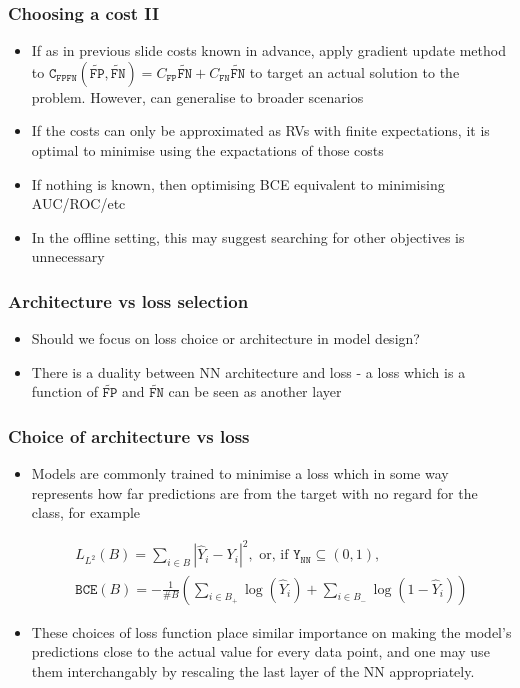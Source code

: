 \documentclass{beamer}
\newcommand{\OUT}{{\texttt{Y}}}
\newcommand{\UC}{{\texttt{C}_{\texttt{FPFN}}}}
\newcommand{\YP}{{\hat Y}}
\newcommand{\FP}{{\texttt{FP}}}
\newcommand{\FN}{{\texttt{FN}}}
\newcommand{\Fp}{\widetilde{\texttt{FP}}}
\newcommand{\Fn}{\widetilde{\texttt{FN}}}
\begin{document}
\begin{frame}
\frametitle{Choosing a cost II}
\begin{itemize}
  \item
    If as in previous slide costs known in advance, apply gradient update method to $\UC(\Fp,\Fn)=C_\FP\Fn+C_\FN\Fn$ to target an actual solution to the problem.  However, can generalise to broader scenarios
  \item
    If the costs can only be approximated as RVs with finite expectations, it is optimal to minimise using the expactations of those costs
  \item
    If nothing is known, then optimising BCE equivalent to minimising AUC/ROC/etc
  \item
    In the offline setting, this may suggest searching for other objectives is unnecessary
\end{itemize}
\end{frame}
\begin{frame}
\frametitle{Architecture vs loss selection}
\begin{itemize}
  \item
    Should we focus on loss choice or architecture in model design?
  \item
    There is a duality between NN architecture and loss - a loss which is a function of $\Fp$ and $\Fn$ can be seen as another layer
\end{itemize}
\end{frame}
\begin{frame}
\frametitle{Choice of architecture vs loss}
\begin{itemize}
\item
Models are commonly trained to minimise a loss which in some way represents how far predictions are from the target with no regard for the class, for example

\begin{gather*}
  L_{L^2}(B)=\sum_{i\in B} |\YP_i-Y_i|^2,\text{ or, if }\OUT_{\texttt{NN}}\subseteq(0,1),\\
  \texttt{BCE}(B)=-\tfrac1{\#B}\left(\sum_{i\in B_+}\log(\hat Y_i)+\sum_{i\in B_-}\log(1-\hat Y_i)\right)
\end{gather*}
\item
These choices of loss function place similar importance on making the model's predictions close to the actual value for every data point, and one may use them interchangably by rescaling the last layer of the NN appropriately.
\end{itemize}
\end{frame}
\end{document}
